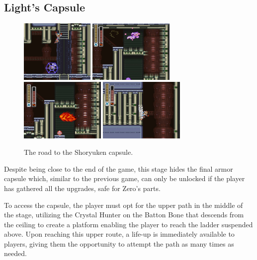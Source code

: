 \subsection{Light's Capsule}\label{X2:Shoryuken}
\begin{figure}[htp]
	\centering
	\includegraphics[height=3cm]{figures/X2/Hunter_stages/Shoryuken_1.png}
	\includegraphics[height=3cm]{figures/X2/Hunter_stages/Shoryuken_2.png}\\
	\vspace{2pt}
	\includegraphics[height=3cm]{figures/X2/Hunter_stages/Shoryuken_3.png}
	\includegraphics[height=3cm]{figures/X2/Hunter_stages/Shoryuken_4.png}
	\caption{The road to the Shoryuken capsule.}
\end{figure}
Despite being close to the end of the game, this stage hides the final armor capsule which, similar to the previous game, can only be unlocked if the player has gathered all the upgrades, safe for Zero's parts.

To access the capsule, the player must opt for the upper path in the middle of the stage, utilizing the Crystal Hunter on the Batton Bone that descends from the ceiling to create a platform enabling the player to reach the ladder suspended above. Upon reaching this upper route, a life-up is immediately available to players, giving them the opportunity to attempt the path as many times as needed.

